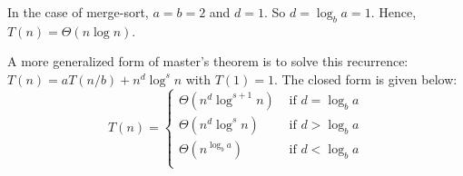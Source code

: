 In the case of merge-sort, $a = b = 2$ and $d = 1$. So $d = \log_b a = 1$.
Hence, $T(n) = \Theta(n\log n)$.

A more generalized form of master's theorem is to solve this recurrence:
$T(n) = aT(n/b) + n^d \log^s n$ with $T(1) = 1$. The closed form is given below: %
\begin{displaymath}
T(n) = \left\{
\begin{array}{llll}
\Theta(n^d \log^{s+1} n) & \textrm{ if } d = \log_b a \\
\Theta(n^d \log^s n) & \textrm{ if } d > \log_b a \\
\Theta(n^{\log_b a}) & \textrm{ if } d < \log_b a \\
\end{array}
\right.
\end{displaymath}

